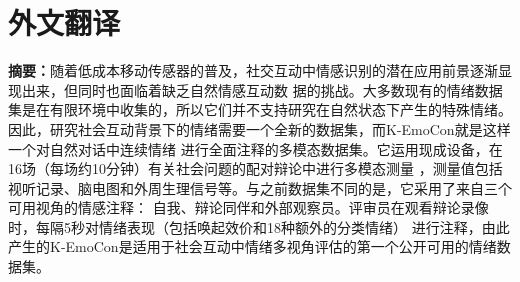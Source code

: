 \cleardoublepage
\chapter{外文翻译}

\textbf{摘要：}随着低成本移动传感器的普及，社交互动中情感识别的潜在应用前景逐渐显现出来，但同时也面临着缺乏自然情感互动数
据的挑战。大多数现有的情绪数据集是在有限环境中收集的，所以它们并不支持研究在自然状态下产生的特殊情绪。
因此，研究社会互动背景下的情绪需要一个全新的数据集，而K-EmoCon就是这样一个对自然对话中连续情绪
进行全面注释的多模态数据集。它运用现成设备，在16场（每场约10分钟）有关社会问题的配对辩论中进行多模态测量
，测量值包括视听记录、脑电图和外周生理信号等。与之前数据集不同的是，它采用了来自三个可用视角的情感注释：
自我、辩论同伴和外部观察员。评审员在观看辩论录像时，每隔5秒对情绪表现（包括唤起效价和18种额外的分类情绪）
进行注释，由此产生的K-EmoCon是适用于社会互动中情绪多视角评估的第一个公开可用的情绪数据集。

